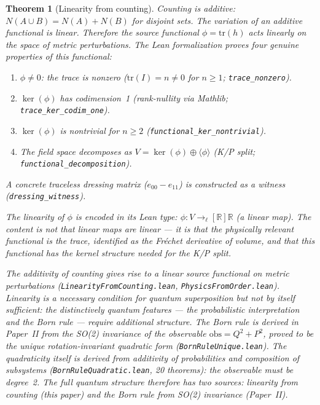 \documentclass[11pt,letterpaper]{article}
\newtheorem{theorem}{Theorem}
\begin{document}
\begin{theorem}[Linearity from counting]
\label{thm:linearity}
Counting is additive: $N(A \cup B) = N(A) + N(B)$ for disjoint sets.
The variation of an additive functional is linear.  Therefore the
source functional $\phi = \mathrm{tr}(h)$ acts linearly on the space
of metric perturbations.  The Lean formalization proves four genuine
properties of this functional:
\begin{enumerate}[nosep]
  \item $\phi \neq 0$: the trace is nonzero ($\mathrm{tr}(I) = n
    \neq 0$ for $n \geq 1$; \texttt{trace\_nonzero}).
  \item $\ker(\phi)$ has codimension~1 (rank-nullity via Mathlib;
    \texttt{trace\_ker\_codim\_one}).
  \item $\ker(\phi)$ is nontrivial for $n \geq 2$
    (\texttt{functional\_ker\_\allowbreak nontrivial}).
  \item The field space decomposes as
    $V = \ker(\phi) \oplus \langle\phi\rangle$ (K/P split;
    \texttt{functional\_\allowbreak decomposition}).
\end{enumerate}
A concrete traceless dressing matrix ($e_{00} - e_{11}$) is
constructed as a witness (\texttt{dressing\_witness}).

The linearity of $\phi$ is encoded in its Lean type: $\phi :
V \to_{\ell}[\mathbb{R}] \mathbb{R}$ (a linear map).  The content
is not that linear maps are linear --- it is that the physically
relevant functional is the trace, identified as the Fr\'echet
derivative of volume, and that this functional has the kernel
structure needed for the K/P split.

The additivity of counting gives rise to a linear source functional
on metric perturbations (\texttt{LinearityFromCounting.lean},
\texttt{PhysicsFromOrder.lean}).  Linearity is a necessary condition
for quantum superposition but not by itself sufficient: the
distinctively quantum features --- the probabilistic interpretation
and the Born rule --- require additional structure.  The Born rule
is derived in Paper~II from the SO(2) invariance of the observable
$\mathrm{obs} = Q^2 + P^2$, proved to be the unique
rotation-invariant quadratic form (\texttt{BornRuleUnique.lean}).
The quadraticity itself is derived from additivity of probabilities
and composition of subsystems (\texttt{BornRuleQuadratic.lean},
20 theorems): the observable must be degree~2.
The full quantum structure therefore
has two sources: linearity from counting (this paper) and the Born
rule from SO(2) invariance (Paper~II).
\end{theorem}
\end{document}
